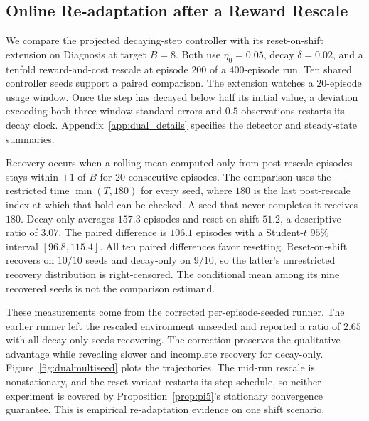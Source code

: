 \subsection{Online Re-adaptation after a Reward Rescale}
\label{sec:dual_multiseed}

We compare the projected decaying-step controller with its reset-on-shift extension on Diagnosis at target $B{=}8$. Both use $\eta_0{=}0.05$, decay $\delta{=}0.02$, and a tenfold reward-and-cost rescale at episode $200$ of a $400$-episode run. Ten shared controller seeds support a paired comparison. The extension watches a $20$-episode usage window. Once the step has decayed below half its initial value, a deviation exceeding both three window standard errors and $0.5$ observations restarts its decay clock. Appendix~\ref{app:dual_details} specifies the detector and steady-state summaries.

Recovery occurs when a rolling mean computed only from post-rescale episodes stays within $\pm1$ of $B$ for $20$ consecutive episodes. The comparison uses the restricted time $\min(T,180)$ for every seed, where $180$ is the last post-rescale index at which that hold can be checked. A seed that never completes it receives $180$. Decay-only averages $157.3$ episodes and reset-on-shift $51.2$, a descriptive ratio of $3.07$. The paired difference is $106.1$ episodes with a Student-$t$ $95\%$ interval $[96.8,115.4]$. All ten paired differences favor resetting. Reset-on-shift recovers on $10/10$ seeds and decay-only on $9/10$, so the latter's unrestricted recovery distribution is right-censored. The conditional mean among its nine recovered seeds is not the comparison estimand.

These measurements come from the corrected per-episode-seeded runner. The earlier runner left the rescaled environment unseeded and reported a ratio of $2.65$ with all decay-only seeds recovering. The correction preserves the qualitative advantage while revealing slower and incomplete recovery for decay-only. Figure~\ref{fig:dualmultiseed} plots the trajectories. The mid-run rescale is nonstationary, and the reset variant restarts its step schedule, so neither experiment is covered by Proposition~\ref{prop:pi5}'s stationary convergence guarantee. This is empirical re-adaptation evidence on one shift scenario.

